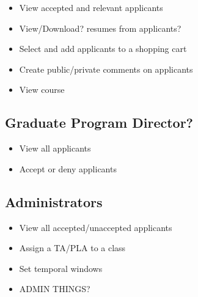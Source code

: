 \documentclass[11pt]{amsart}
\begin{document}
\begin{itemize}
    \item{View accepted and relevant applicants}
    \item{View/Download? resumes from applicants?}
    \item{Select and add applicants to a shopping cart}
    \item{Create public/private comments on applicants}
    \item{View course}
\end{itemize}

\subsection{Graduate Program Director?}

\begin{itemize}
    \item{View all applicants}
    \item{Accept or deny applicants}
\end{itemize}

\subsection{Administrators}

\begin{itemize}
    \item{View all accepted/unaccepted applicants}
    \item{Assign a TA/PLA to a class}
    \item{Set temporal windows}
    \item{ADMIN THINGS?}
\end{itemize}
\end{document}
